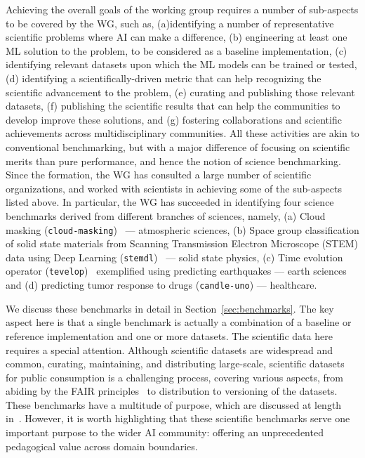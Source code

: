 Achieving the overall goals of the working group requires a number of sub-aspects to be covered by the WG, such as, (a)identifying a number of representative scientific problems where AI can make a difference, (b) engineering at least one ML solution to the problem, to be considered as a baseline implementation, (c) identifying relevant datasets upon which the ML models can be trained or tested, (d) identifying a scientifically-driven metric that can help recognizing the scientific advancement to the problem, (e) curating and publishing those relevant datasets, (f) publishing the scientific results that can help the communities to develop improve these solutions, and (g) fostering collaborations and scientific achievements across multidisciplinary communities. All these activities are akin to conventional benchmarking, but with a major difference of focusing on scientific merits than pure performance, and hence the notion of science benchmarking. Since the formation, the WG has consulted a large number of scientific organizations, and worked with scientists in achieving some of the sub-aspects listed above.  In particular, the WG has succeeded in identifying four science benchmarks derived from different branches of sciences, namely, (a)  Cloud masking ({\tt cloud-masking})~\cite{sciml-bench:2021}  --- atmospheric sciences, (b) Space group classification of solid state materials from Scanning Transmission Electron Microscope (STEM) data using  Deep Learning  ({\tt stemdl})~\cite{laanait-scanning} --- solid state physics, (c) Time evolution operator ({\tt tevelop})~\cite{fox2022-jm} exemplified using predicting earthquakes --- earth sciences and (d) predicting tumor response to  drugs ({\tt candle-uno}) --- healthcare.

We discuss these benchmarks in detail in Section~\ref{sec:benchmarks}. The key aspect here is that a single benchmark is actually a combination of a baseline or reference implementation and one or more datasets. The scientific data here requires a special attention. Although scientific datasets are widespread and common, curating, maintaining, and distributing large-scale, scientific datasets for public consumption is a challenging process, covering various aspects, from abiding by the FAIR principles~\cite{wilkinson2016fair} to distribution to versioning of the datasets.  These benchmarks have a multitude of purpose, which are discussed at length in~\cite{natrev:jeyan,roysoc:tonyhey}. However, it is worth highlighting that these scientific benchmarks serve one important purpose to the wider AI community: offering an unprecedented pedagogical value across domain boundaries. 


